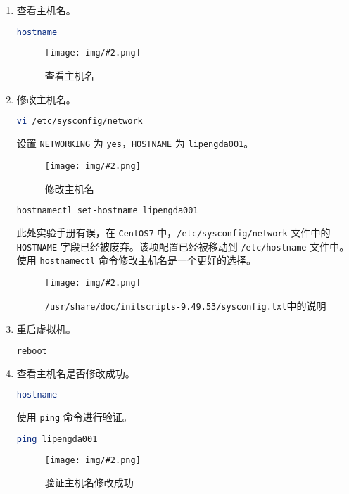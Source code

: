 \documentclass{article}
\newcommand{\notebox}[2][NOTE]{%
    \begin{tcolorbox}[
        colback=cyan!5!white,          
        colframe=cyan!50!black,       
        fonttitle=\bfseries\large,   
        coltitle=white,               
        title=#1,
        rounded corners,              
        boxrule=1.5pt,                
        width=\textwidth,            
        drop shadow=black!30,         
        enhanced,                  
    ]
    #2
    \end{tcolorbox}
}
\newenvironment{enum}{
    \begin{enumerate}[label=(\arabic*), noitemsep]
}{
    \end{enumerate}
}
\newcommand{\img}[3][0.9]{%
    \begin{figure}[H]
        \centering
        \texttt{[image: img/\#2.png]}
        \caption{#3}
    \end{figure}
}
\begin{document}
\begin{enum}
    \item 查看主机名。
    
    \begin{lstlisting}[language=bash]
    hostname
    \end{lstlisting}

    \img{1.2.2.1}{查看主机名}

    \item 修改主机名。
    
    \begin{lstlisting}[language=bash]
    vi /etc/sysconfig/network
    \end{lstlisting}

    设置 \texttt{NETWORKING} 为 \texttt{yes}，\texttt{HOSTNAME} 为 \texttt{lipengda001}。

    \img{1.2.2.2}{修改主机名}

    \begin{lstlisting}[language=bash]
    hostnamectl set-hostname lipengda001
    \end{lstlisting}

    \notebox{
        此处实验手册有误，在 \texttt{CentOS7} 中，\texttt{/etc/sysconfig/network} 文件中的 \texttt{HOSTNAME} 字段已经被废弃。该项配置已经被移动到 \texttt{/etc/hostname} 文件中。使用 \texttt{hostnamectl} 命令修改主机名是一个更好的选择。

        \img{1.2.2.3}{\texttt{/usr/share/doc/initscripts-9.49.53/sysconfig.txt}中的说明}
    }

    \item 重启虚拟机。
    
    \begin{lstlisting}[language=bash]
    reboot
    \end{lstlisting}

    \item 查看主机名是否修改成功。

    \begin{lstlisting}[language=bash]
    hostname
    \end{lstlisting}

    使用 \texttt{ping} 命令进行验证。

    \begin{lstlisting}[language=bash]
    ping lipengda001
    \end{lstlisting}

    \img{1.2.2.4}{验证主机名修改成功}
\end{enum}
\end{document}
